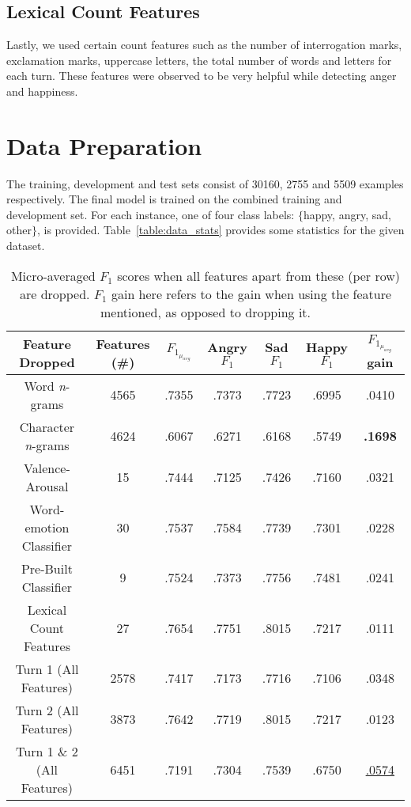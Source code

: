 \documentclass[11pt,a4paper]{article}
\begin{document}
\subsection{Lexical Count Features} \label{Lexical Features}
Lastly, we used certain count features such as the number of interrogation marks, exclamation marks, uppercase letters, the total number of words and letters for each turn. These features were observed to be very helpful while detecting anger and happiness.

\section{Data Preparation}

The training, development and test sets consist of 30160, 2755 and 5509 examples respectively. The final model is trained on the combined training and development set. For each instance, one of four class labels: $\{$happy, angry, sad, other$\}$, is provided. Table~\ref{table:data_stats} provides some statistics for the given dataset.
\begin{table*}[t]
\centering
 \begin{tabular}{||c |c |c |c | c| c| c||} 
 \hline
 Feature Dropped & Features (\#) & $F_{1_{\mu_{avg}}}$ & Angry $F_{1}$ & Sad $F_{1}$ & Happy $F_{1}$ & $F_{1_{\mu_{avg}}}$ gain\\
 \hline
 Word \textit{n}-grams & 4565 & .7355 & .7373 & .7723 & .6995 & .0410\\
 Character \textit{n}-grams & 4624 & .6067 & .6271 & .6168 & .5749 & \textbf{.1698}\\
 Valence-Arousal & 15 & .7444 & .7125 & .7426 & .7160 & .0321\\
 Word-emotion Classifier & 30 & .7537 & .7584 & .7739 & .7301 & .0228\\
 Pre-Built Classifier & 9 & .7524 & .7373 & .7756 & .7481 & .0241\\
 Lexical Count Features & 27 & .7654 & .7751 & .8015 & .7217 & .0111\\
 \hline
 Turn 1 (All Features) & 2578 & .7417 & .7173 & .7716 & .7106 & .0348\\
 Turn 2 (All Features) & 3873 & .7642 & .7719 & .8015 & .7217 & .0123\\
 Turn 1 \& 2 (All Features) & 6451 & .7191 & .7304 & .7539 & .6750 & \underline{.0574}\\
 \hline
 \end{tabular}
 \caption{Micro-averaged $F_{1}$ scores when all features apart from these (per row) are dropped. $F_{1}$ gain here refers to the gain when using the feature mentioned, as opposed to dropping it.}
 \label{table:ablation}
\end{table*}
\end{document}
